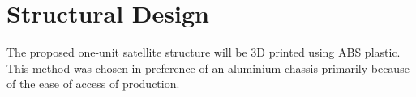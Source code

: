 \section{Structural Design}
The proposed one-unit satellite structure will be 3D printed using ABS plastic. This method was chosen in preference of an aluminium chassis primarily because of the ease of access of production. 
